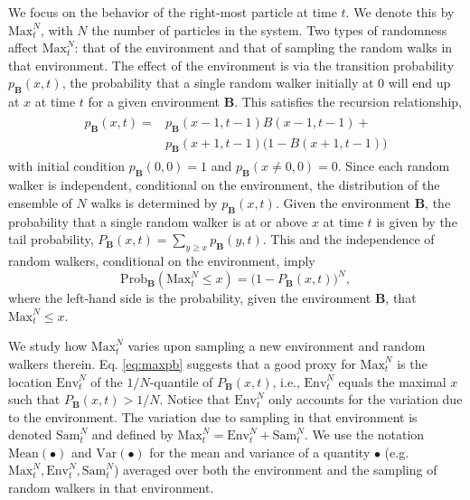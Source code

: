 \documentclass[%
 reprint,
 amsmath,amssymb,
 longbibliography,
 aps,
prl
]{revtex4-1}
\newcommand{\mean}[1]{\mathrm{Mean}\left(#1\right)}
\newcommand{\var}[1]{\mathrm{Var}\left(#1\right)}
\def\maxnt{\mathrm{Max}^{N}_t}
\def\envnt{\mathrm{Env}^{N}_t}
\def\snt{\mathrm{Sam}^{N}_t}
\begin{document}
We focus on the behavior of the right-most particle at time $t$. We denote this by $\maxnt$, with $N$ the number of particles in the system. Two types of randomness affect $\maxnt$: that of the environment and that of sampling the random walks in that environment. The effect of the environment is via the transition probability $p_{\mathbf{B}}(x,t)$, the probability that a single random walker initially at $0$ will end up at $x$ at time $t$ for a given environment $\mathbf{B}$. This satisfies the recursion relationship, %
%
\begin{align} \label{eq:kolmogorov}
 \begin{split}
  p_{\mathbf{B}}(x,t) = & p_{\mathbf{B}}(x-1,t-1)B(x-1,t-1) +\\
  & p_{\mathbf{B}}(x+1,t-1)\big(1-B(x+1,t-1)\big)
 \end{split}
\end{align}
%
with initial condition $p_{\mathbf{B}}(0,0) = 1$ and $p_{\mathbf{B}}(x \neq 0,0) = 0$. Since each random walker is independent, conditional on the environment, the distribution of the ensemble of $N$ walks is determined by $p_{\mathbf{B}}(x,t)$. Given the environment $\mathbf{B}$, the probability that a single random walker is at or above $x$ at time $t$ is given by the tail probability, $P_{\mathbf{B}}(x,t) = \sum_{y\geq x} p_{\mathbf{B}}(y,t)$. This and the independence of random walkers, conditional on the environment, imply
%
\begin{equation}\label{eq:maxpb}
\mathrm{Prob}_{\mathbf{B}}(\maxnt \leq x) = \big(1-P_{\mathbf{B}}(x,t)\big)^N,
\end{equation}
%
where the left-hand side is the probability, given the environment $\mathbf{B}$, that $\maxnt \leq x$.

We study how $\maxnt$ varies upon sampling a new environment and random walkers therein. Eq. \eqref{eq:maxpb} suggests that a good proxy for $\maxnt$ is the location $\envnt$ of the $1/N$-quantile of $P_{\mathbf{B}}(x,t)$, i.e., $\envnt$ equals the maximal $x$ such that $P_{\mathbf{B}}(x,t)>1/N$. Notice that $\envnt$ only accounts for the variation due to the environment. The variation due to sampling in that environment is denoted $\snt$ and defined by $\maxnt = \envnt + \snt$. We use the notation $\mean{\bullet}$ and $\var{\bullet}$ for the mean and variance of a quantity $\bullet$ (e.g. $\maxnt, \envnt,\snt$) averaged over both the environment and the sampling of random walkers in that environment.
\end{document}
